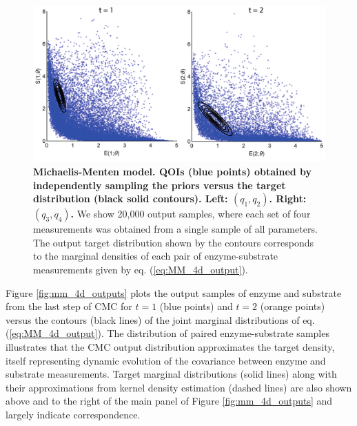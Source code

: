 \begin{figure}[H]
  \centerline{\includegraphics[width=\textwidth]{../figures/mm_4d_main.pdf}}
  \caption{\textbf{Michaelis-Menten model. QOIs (blue points) obtained by independently sampling the priors versus the target distribution (black solid contours). Left: $(q_1,q_2)$. Right: $(q_3,q_4)$.} We show 20,000 output samples, where each set of four measurements was obtained from a single sample of all parameters. The output target distribution shown by the contours corresponds to the marginal densities of each pair of enzyme-substrate measurements given by eq. (\ref{eq:MM_4d_output}).}
  \label{fig:mm_4d_main}
\end{figure}

Figure \ref{fig:mm_4d_outputs} plots the output samples of enzyme and substrate from the last step of CMC for $t=1$ (blue points) and $t=2$ (orange points) versus the contours (black lines) of the joint marginal distributions of eq. (\ref{eq:MM_4d_output}). The distribution of paired enzyme-substrate samples illustrates that the CMC output distribution approximates the target density, itself representing dynamic evolution of the covariance between enzyme and substrate measurements. Target marginal distributions (solid lines) along with their approximations from kernel density estimation (dashed lines) are also shown above and to the right of the main panel of Figure \ref{fig:mm_4d_outputs} and largely indicate correspondence.

